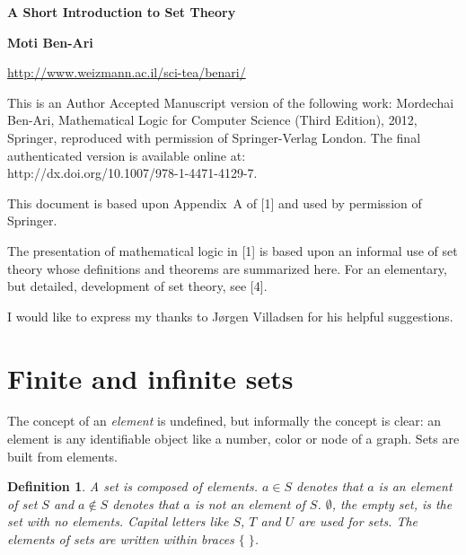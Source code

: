 \documentclass[12pt,a4paper]{article}
\newtheorem{definition}[theorem]{Definition}
\begin{document}
\thispagestyle{empty}

\begin{center}
\textbf{\Large A Short Introduction to Set Theory}

\bigskip

\textbf{\Large Moti Ben-Ari}

\bigskip

\url{http://www.weizmann.ac.il/sci-tea/benari/}

\end{center}

\begin{small}
This is an Author Accepted Manuscript version of the following work:
Mordechai Ben-Ari, Mathematical Logic for Computer Science (Third Edition),
2012, Springer, reproduced with permission of Springer-Verlag London.
The final authenticated version is available online at:\\
http://dx.doi.org/10.1007/978-1-4471-4129-7.
\end{small}
\bigskip

\tableofcontents

\newpage

This document is based upon Appendix~A of [1] and used by permission of Springer.

The presentation of mathematical logic in [1] is based upon an informal use of set theory whose definitions and theorems are summarized here. For an elementary, but detailed, development of set theory, see [4].

I would like to express my thanks to J\o{}rgen Villadsen for his helpful suggestions.	

\section{Finite and infinite sets}

The concept of an \emph{element} is undefined, but informally the
concept is clear: an element is any identifiable object like a number,
color or node of a graph. Sets are built from elements.

\begin{definition}
A \emph{set} is composed of
\emph{elements}. $a\in S$ denotes
that $a$ is an element of set $S$ and $a\not\in S$ denotes that $a$ is \emph{not} an element of $S$. $\emptyset$,  the \emph{empty set}, is the set with no
elements. Capital letters like $S$, $T$ and $U$
are used for sets. The elements of sets are written within braces $\{\;\}$.
\end{definition}
\end{document}
